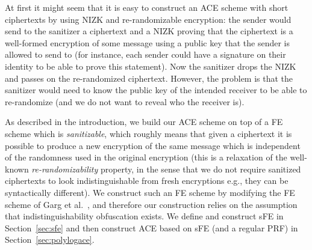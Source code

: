 \documentclass{llncs}
\begin{document}
At first it might seem that it is easy to construct an ACE scheme with short ciphertexts by using NIZK and re-randomizable encryption: the sender would send to the sanitizer a ciphertext and a NIZK proving that the ciphertext is a well-formed encryption of some message using a public key that the sender is allowed to send to (for instance, each sender could have a signature on their identity to be able to prove this statement). Now the sanitizer drops the NIZK and passes on the re-randomized ciphertext. However, the problem is that the sanitizer would need to know the public key of the intended receiver to be able to re-randomize (and we do not want to reveal who the receiver is). 

As described in the introduction, we build our ACE scheme on top of a FE scheme which is \emph{sanitizable}, which roughly means that given a ciphertext it is possible to produce a new encryption of the same message which is independent of the randomness used in the original encryption (this is a relaxation of the well-known \emph{re-randomizability} property, in the sense that we do not require sanitized ciphertexts to look indistinguishable from fresh encryptions e.g., they can be syntactically different). We construct such an FE scheme by modifying the FE scheme of Garg et al.~\cite{DBLP:conf/focs/GargGH0SW13}, and therefore our construction relies on the assumption that indistinguishability obfuscation exists. We define and construct sFE in Section~\ref{sec:sfe} and then construct ACE based on sFE (and a regular PRF) in Section~\ref{sec:polylogace}. 
\end{document}
